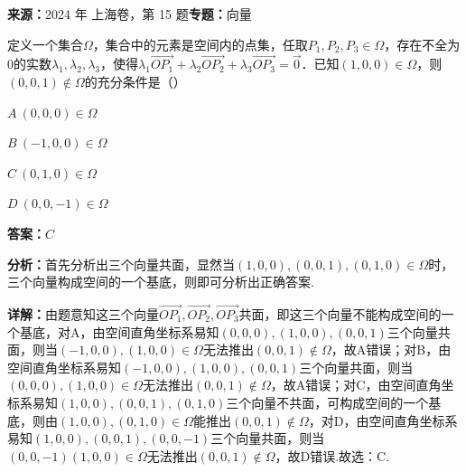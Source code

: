 \begin{question}[points=5]
\textbf{来源：}2024 年 上海卷，第 15 题\quad \textbf{专题：}向量\par
定义一个集合$\Omega$，集合中的元素是空间内的点集，任取$P_1,P_2,P_3\in\Omega$，存在不全为0的实数$\lambda_1,\lambda_2,\lambda_3$，使得$\lambda_1\overrightarrow{OP_1}+\lambda_2\overrightarrow{OP_2}+\lambda_3\overrightarrow{OP_3}=\vec{0}$．已知$(1,0,0)\in\Omega$，则$(0,0,1)\notin\Omega$的充分条件是（\quad\quad）
\begin{choices}
  \item $A\ (0,0,0)\in\Omega$
  \item $B\ (-1,0,0)\in\Omega$
  \item $C\ (0,1,0)\in\Omega$
  \item $D\ (0,0,-1)\in\Omega$
\end{choices}
\begin{solution}
\textbf{答案：}$C$

\textbf{分析：}首先分析出三个向量共面，显然当$(1,0,0),(0,0,1),(0,1,0)\in\Omega$时，三个向量构成空间的一个基底，则即可分析出正确答案.

\textbf{详解：}由题意知这三个向量$\overrightarrow{OP_1},\overrightarrow{OP_2},\overrightarrow{OP_3}$共面，即这三个向量不能构成空间的一个基底，对A，由空间直角坐标系易知$(0,0,0),(1,0,0),(0,0,1)$三个向量共面，则当$(-1,0,0),(1,0,0)\in\Omega$无法推出$(0,0,1)\notin\Omega$，故A错误；对B，由空间直角坐标系易知$(-1,0,0),(1,0,0),(0,0,1)$三个向量共面，则当$(0,0,0),(1,0,0)\in\Omega$无法推出$(0,0,1)\notin\Omega$，故A错误；对C，由空间直角坐标系易知$(1,0,0),(0,0,1),(0,1,0)$三个向量不共面，可构成空间的一个基底，则由$(1,0,0),(0,1,0)\in\Omega$能推出$(0,0,1)\notin\Omega$，对D，由空间直角坐标系易知$(1,0,0),(0,0,1),(0,0,-1)$三个向量共面，则当$(0,0,-1)(1,0,0)\in\Omega$无法推出$(0,0,1)\notin\Omega$，故D错误.故选：C.
\end{solution}
\end{question}

